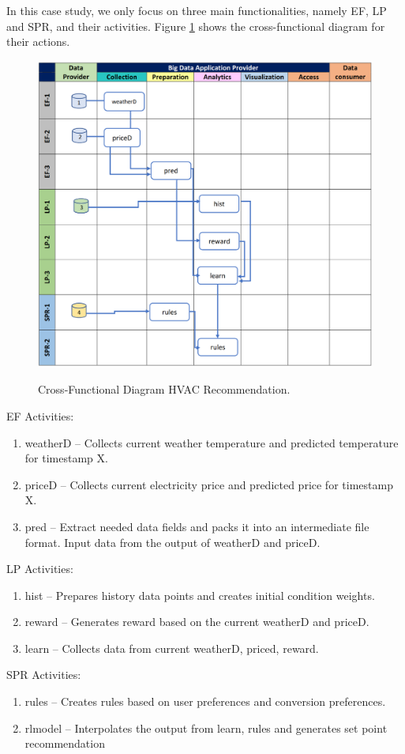 In this case study, we only focus on three main functionalities, namely EF, LP and SPR, and their
activities. Figure \ref{fig:hvac-2} shows the cross-functional diagram for their actions.



\begin{figure}[htb]
\includegraphics[width=1.0\textwidth]{usecase/hvac-2.png}
\label{fig:hvac-2}
\caption{Cross-Functional Diagram HVAC Recommendation.}
\end{figure}


EF Activities:

\begin{enumerate}
\item weatherD – Collects current weather temperature and predicted temperature for timestamp
X.
\item priceD – Collects current electricity price and predicted price for timestamp X.
\item pred – Extract needed data fields and packs it into an intermediate file format. Input data
from the output of weatherD and priceD.
\end{enumerate}


LP Activities:

\begin{enumerate}
\item hist – Prepares history data points and creates initial condition weights.
\item reward – Generates reward based on the current weatherD and priceD.
\item learn – Collects data from current weatherD, priced, reward.
\end{enumerate}

SPR Activities:

\begin{enumerate}
\item rules – Creates rules based on user preferences and conversion preferences.
\item rlmodel – Interpolates the output from learn, rules and generates set point recommendation
\end{enumerate}

